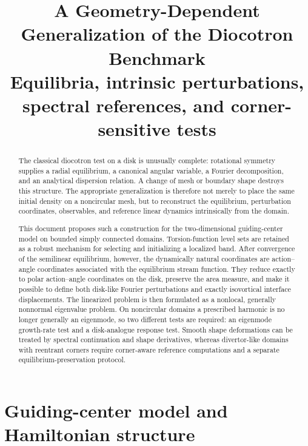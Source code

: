 \documentclass[11pt,a4paper]{article}
\title{\textbf{A Geometry-Dependent Generalization of the Diocotron Benchmark}\\[0.4em]
\large Equilibria, intrinsic perturbations, spectral references, and corner-sensitive tests}
\author{}
\date{}
\begin{document}
\maketitle

\begin{abstract}
The classical diocotron test on a disk is unusually complete: rotational symmetry supplies a radial equilibrium, a canonical angular variable, a Fourier decomposition, and an analytical dispersion relation. A change of mesh or boundary shape destroys this structure. The appropriate generalization is therefore not merely to place the same initial density on a noncircular mesh, but to reconstruct the equilibrium, perturbation coordinates, observables, and reference linear dynamics intrinsically from the domain.

This document proposes such a construction for the two-dimensional guiding-center model on bounded simply connected domains. Torsion-function level sets are retained as a robust mechanism for selecting and initializing a localized band. After convergence of the semilinear equilibrium, however, the dynamically natural coordinates are action--angle coordinates associated with the equilibrium stream function. They reduce exactly to polar action--angle coordinates on the disk, preserve the area measure, and make it possible to define both disk-like Fourier perturbations and exactly isovortical interface displacements. The linearized problem is then formulated as a nonlocal, generally nonnormal eigenvalue problem. On noncircular domains a prescribed harmonic is no longer generally an eigenmode, so two different tests are required: an eigenmode growth-rate test and a disk-analogue response test. Smooth shape deformations can be treated by spectral continuation and shape derivatives, whereas divertor-like domains with reentrant corners require corner-aware reference computations and a separate equilibrium-preservation protocol.
\end{abstract}

\tableofcontents

\section{Guiding-center model and Hamiltonian structure}
\end{document}
